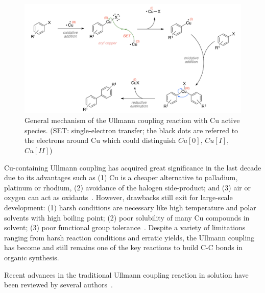\documentclass[%
 reprint,
 amsmath,amssymb,
 aps,
prb,
]{revtex4-2}
\begin{document}
\begin{figure}[htb]
\centering
\includegraphics[width=0.90\columnwidth]{Fig/classical-mechanism.png}
\caption{General mechanism of the Ullmann coupling reaction with Cu active species. (SET: single-electron transfer; the black dots are referred to the electrons around Cu which could distinguish $Cu[0]$, $Cu[I]$, $Cu[II]$)}
\label{fig:classical}
\end{figure}
Cu-containing Ullmann coupling has acquired great significance in the last decade due to its advantages such as (1) Cu is a cheaper alternative to palladium, platinum or rhodium,  (2) avoidance of the halogen side-product; and (3) air or oxygen can act as oxidants~\cite{ullmann_38,ullmann_39,ullmann_40,ullmann_41}. However, drawbacks still exit for large-scale development: (1) harsh conditions are necessary like high temperature and polar solvents with high boiling point; (2) poor solubility of many Cu compounds in solvent; (3) poor functional group tolerance~\cite{ullmann_31}. Despite a variety of limitations ranging from harsh reaction conditions and erratic yields, the Ullmann coupling has become and still remains one of the key reactions to build C-C bonds in organic synthesis. 

Recent advances in the traditional Ullmann coupling reaction in solution have been reviewed by several authors~\cite{ullmann_29,ullmann_30,ullmann_31,ullmann_32}.
\end{document}
